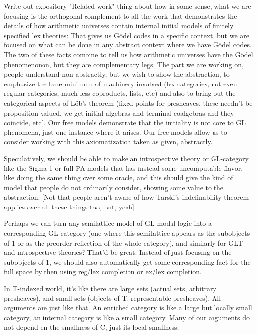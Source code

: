 Write out expository "Related work" thing about how in some sense, what we are focusing is the orthogonal complement to all the work that demonstrates the details of how arithmetic universes contain internal initial models of finitely specified lex theories: That gives us Gödel codes in a specific context, but we are focused on what can be done in any abstract context where we have Gödel codes. The two of these facts combine to tell us how arithmetic universes have the Gödel phenomenonon, but they are complementary legs. The part we are working on, people understand non-abstractly, but we wish to show the abstraction, to emphasize the bare minimum of machinery involved (lex categories, not even regular categories, much less coproducts, lists, etc) and also to bring out the categorical aspects of Löb's theorem (fixed points for presheaves, these needn't be proposition-valued, we get initial algebras and terminal coalgebras and they coincide, etc). Our free models demonstrate that the initiality is not core to GL phenomena, just one instance where it arises. Our free models allow us to consider working with this axiomatization taken as given, abstractly.

Speculatively, we should be able to make an introspective theory or GL-category like the Sigma-1 or full PA models that has instead some uncomputable flavor, like doing the same thing over some oracle, and this should give the kind of model that people do not ordinarily consider, showing some value to the abstraction. [Not that people aren't aware of how Tarski's indefinability theorem applies over all these things too, but, yeah]

Perhaps we can turn any semilattice model of GL modal logic into a corresponding GL-category (one where this semilattice appears as the subobjects of 1 or as the preorder reflection of the whole category), and similarly for GLT and introspective theories? That'd be great. Instead of just focusing on the subobjects of 1, we should also automatically get some corresponding fact for the full space by then using reg/lex completion or ex/lex completion.

In T-indexed world, it's like there are large sets (actual sets, arbitrary presheaves), and small sets (objects of T, representable presheaves). All arguments are just like that. An enriched category is like a large but locally small category, an internal category is like a small category. Many of our arguments do not depend on the smallness of C, just its local smallness.
